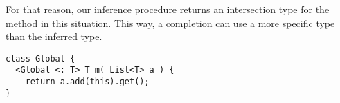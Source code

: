 For that reason, our inference procedure returns an intersection type
for the method in this situation. This way, a completion can use a
more specific type than the inferred type.

\begin{lstlisting}
class Global {
  <Global <: T> T m( List<T> a ) {
    return a.add(this).get();
}
\end{lstlisting}



